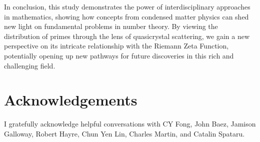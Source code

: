 \documentclass[11pt, oneside]{article}
\begin{document}
In conclusion, this study demonstrates the power of interdisciplinary approaches in mathematics, showing how concepts from condensed matter physics can shed new light on fundamental problems in number theory. By viewing the distribution of primes through the lens of quasicrystal scattering, we gain a new perspective on its intricate relationship with the Riemann Zeta Function, potentially opening up new pathways for future discoveries in this rich and challenging field.

\section{Acknowledgements}
I gratefully acknowledge helpful conversations with CY Fong, John Baez, Jamison Galloway, Robert Hayre, Chun Yen Lin, Charles Martin, and Catalin Spataru.

\printbibliography
\end{document}
